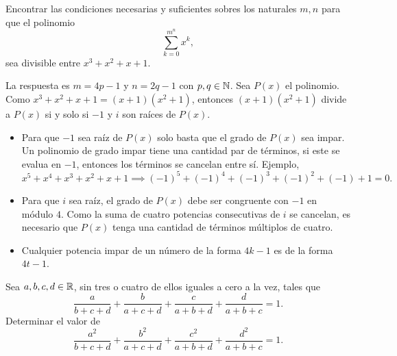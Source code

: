 \begin{exercise}
    Encontrar las condiciones necesarias y suficientes sobres los naturales $m,n$ para que el polinomio
    \[
        \sum_{k = 0}^{m^n} x^k,
    \]
    sea divisible entre $x^3 + x^2 + x + 1$.
\end{exercise}

\begin{solution}
    La respuesta es $m = 4p - 1$ y $n = 2q - 1$ con $p,q \in \mathbb{N}$.
    Sea $P(x)$ el polinomio.
    Como $x^3 + x^2 + x + 1 = (x + 1)(x^2 + 1)$, entonces $(x + 1)(x^2 + 1)$ divide a $P(x)$ si y solo si $-1$ y $i$ son raíces de $P(x)$.
    \begin{itemize}
        \item Para que $-1$ sea raíz de $P(x)$ solo basta que el grado de $P(x)$ sea impar.
        Un polinomio de grado impar tiene una cantidad par de términos, si este se evalua en $-1$, entonces los términos se cancelan entre sí.
        Ejemplo,
        \[
            x^5 + x^4 + x^3 + x^2 + x + 1 \implies (-1)^5 + (-1)^4 + (-1)^3 + (-1)^2 + (-1) + 1 = 0.
        \]
        \item Para que $i$ sea raíz, el grado de $P(x)$ debe ser congruente con $-1$ en módulo $4$.
        Como la suma de cuatro potencias consecutivas de $i$ se cancelan, es necesario que $P(x)$ tenga una cantidad de términos múltiplos de cuatro.
        \item Cualquier potencia impar de un número de la forma $4k - 1$ es de la forma $4t - 1$. \qedhere
    \end{itemize}
\end{solution}

\begin{exercise}
    Sea $a,b,c,d \in \mathbb{R}$, sin tres o cuatro de ellos iguales a cero a la vez, tales que
    \[
        \frac{a}{b + c + d} + \frac{b}{a + c + d} + \frac{c}{a + b + d} + \frac{d}{a + b + c} = 1.
    \]
    Determinar el valor de
    \[
        \frac{a^2}{b + c + d} + \frac{b^2}{a + c + d} + \frac{c^2}{a + b + d} + \frac{d^2}{a + b + c} = 1.
    \]
\end{exercise}

